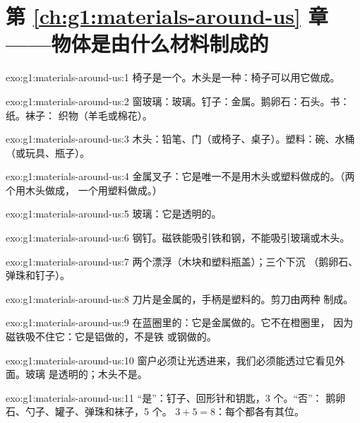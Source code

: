 \section*{第 \ref{ch:g1:materials-around-us} 章——物体是由什么材料制成的}

\begin{solution}{exo:g1:materials-around-us:1}
椅子是一个。木头是一种：椅子可以用它做成。
\end{solution}

\begin{solution}{exo:g1:materials-around-us:2}
窗玻璃：玻璃。钉子：金属。鹅卵石：石头。书：纸。袜子：
织物（羊毛或棉花）。
\end{solution}

\begin{solution}{exo:g1:materials-around-us:3}
木头：铅笔、门（或椅子、桌子）。塑料：碗、水桶
（或玩具、瓶子）。
\end{solution}

\begin{solution}{exo:g1:materials-around-us:4}
金属叉子：它是唯一不是用木头或塑料做成的。（两个用木头做成，
一个用塑料做成。）
\end{solution}

\begin{solution}{exo:g1:materials-around-us:5}
玻璃：它是透明的。
\end{solution}

\begin{solution}{exo:g1:materials-around-us:6}
钢钉。磁铁能吸引铁和钢，不能吸引玻璃或木头。
\end{solution}

\begin{solution}{exo:g1:materials-around-us:7}
两个漂浮（木块和塑料瓶盖）；三个下沉
（鹅卵石、弹珠和钉子）。
\end{solution}

\begin{solution}{exo:g1:materials-around-us:8}
刀片是金属的，手柄是塑料的。剪刀由两种
制成。
\end{solution}

\begin{solution}{exo:g1:materials-around-us:9}
在蓝圈里的：它是金属做的。它不在橙圈里，
因为磁铁吸不住它：它是铝做的，不是铁
或钢做的。
\end{solution}

\begin{solution}{exo:g1:materials-around-us:10}
窗户必须让光透进来，我们必须能透过它看见外面。玻璃
是透明的；木头不是。
\end{solution}

\begin{solution}{exo:g1:materials-around-us:11}
“是”：钉子、回形针和钥匙，3 个。“否”：
鹅卵石、勺子、罐子、弹珠和袜子，5 个。
$3 + 5 = 8$：每个都各有其位。
\end{solution}
